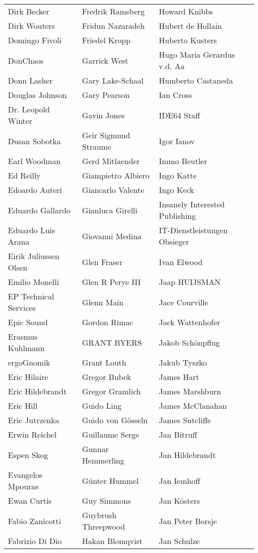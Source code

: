 \begin{small}
\begin{tabular}{p{4cm}p{4cm}p{4cm}}
Dirk Becker & Fredrik Ramsberg & Howard Knibbs \\
Dirk Wouters & Fridun Nazaradeh & Hubert de Hollain \\
Domingo Fivoli & Friedel Kropp & Huberto Kusters \\
DonChaos & Garrick West & Hugo Maria Gerardus v.d. Aa \\
Donn Lasher & Gary Lake-Schaal & Humberto Castaneda \\
Douglas Johnson & Gary Pearson & Ian Cross \\
Dr. Leopold Winter & Gavin Jones & IDE64 Staff \\
Dusan Sobotka & Geir Sigmund Straume & Igor Ianov \\
Earl Woodman & Gerd Mitlaender & Immo Beutler \\
Ed Reilly & Giampietro Albiero & Ingo Katte \\
Edoardo Auteri & Giancarlo Valente & Ingo Keck \\
Eduardo Gallardo & Gianluca Girelli & Insanely Interested Publishing \\
Eduardo Luis Arana & Giovanni Medina & IT-Dienstleistungen Obsieger \\
Eirik Juliussen Olsen & Glen Fraser & Ivan Elwood \\
Emilio Monelli & Glen R Perye III & Jaap HUIJSMAN \\
EP Technical Services & Glenn Main & Jace Courville \\
Epic Sound & Gordon Rimac & Jack Wattenhofer \\
Erasmus Kuhlmann & GRANT BYERS & Jakob Schönpflug \\
ergoGnomik & Grant Louth & Jakub Tyszko \\
Eric Hilaire & Gregor Bubek & James Hart \\
Eric Hildebrandt & Gregor Gramlich & James Marshburn \\
Eric Hill & Guido Ling & James McClanahan \\
Eric Jutrzenka & Guido von Gösseln & James Sutcliffe \\
Erwin Reichel & Guillaume Serge & Jan Bitruff \\
Espen Skog & Gunnar Hemmerling & Jan Hildebrandt \\
Evangelos Mpouras & Günter Hummel & Jan Iemhoff \\
Ewan Curtis & Guy Simmons & Jan Kösters \\
Fabio Zanicotti & Guybrush Threepwood & Jan Peter Borsje \\
Fabrizio Di Dio & Hakan Blomqvist & Jan Schulze \\

\end{tabular}
\end{small}
